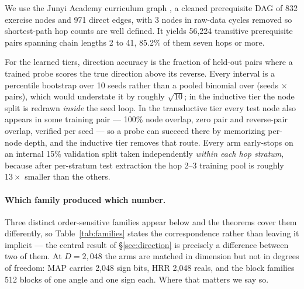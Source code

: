 \documentclass[10pt]{article}
\begin{document}
We use the Junyi Academy curriculum graph \citep{junyi2020dataset}, a cleaned prerequisite DAG of 832 exercise nodes and 971 direct edges, with 3 nodes in raw-data cycles removed so shortest-path hop counts are well defined. It yields 56{,}224 transitive prerequisite pairs spanning chain lengths 2 to 41, 85.2\% of them seven hops or more.

For the learned tiers, direction accuracy is the fraction of held-out pairs where a trained probe scores the true direction above its reverse. Every interval is a percentile bootstrap over 10 seeds rather than a pooled binomial over (seeds $\times$ pairs), which would understate it by roughly $\sqrt{10}$; in the inductive tier the node split is redrawn \emph{inside} the seed loop. In the transductive tier every test node also appears in some training pair --- 100\% node overlap, zero pair and reverse-pair overlap, verified per seed --- so a probe can succeed there by memorizing per-node depth, and the inductive tier removes that route. Every arm early-stops on an internal 15\% validation split taken independently \emph{within each hop stratum}, because after per-stratum test extraction the hop 2--3 training pool is roughly $13\times$ smaller than the others.

\paragraph{Which family produced which number.} Three distinct order-sensitive families appear below and the theorems cover them differently, so Table~\ref{tab:families} states the correspondence rather than leaving it implicit --- the central result of \S\ref{sec:direction} is precisely a difference between two of them. At $D = 2{,}048$ the arms are matched in dimension but not in degrees of freedom: MAP carries 2{,}048 sign bits, HRR 2{,}048 reals, and the block families 512 blocks of one angle and one sign each. Where that matters we say so.
\end{document}
